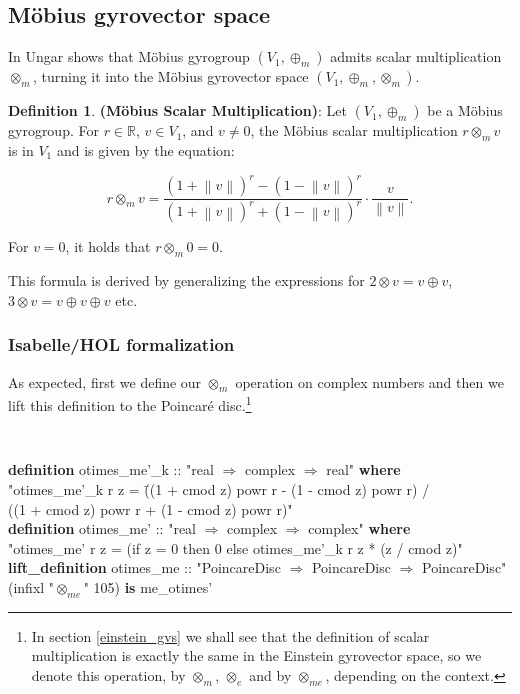 \documentclass[a4paper]{article}
\newcommand{\tab}{\hspace{5mm}}
\theoremstyle{definition}
\newtheorem{definition}{Definition}[section]
\newcommand{\norm}[1]{\left\lVert#1\right\rVert}
\begin{document}
\subsection{M\"obius gyrovector space}

In \cite{ungar-analytic} Ungar shows that M\" obius gyrogroup
$(V_1, \oplus_m)$ admits scalar multiplication $\otimes_m$, turning it
into the M\" obius gyrovector space $(V_1, \oplus_m, \otimes_m)$.

\begin{definition}\textbf{(M\" obius Scalar Multiplication)}: Let
  $(V_1, \oplus_m)$ be a M\" obius gyrogroup. For $r \in \mathbb{R}$,
  $v \in V_1$, and $v \neq 0$, the M\" obius scalar multiplication
  $r\otimes_{m} v$ is in $V_1$ and is given by the equation:

  \begin{equation}
   \label{eq:otimes}
    r\otimes_{m} v = \frac{(1+\norm{v})^r - (1-\norm{v})^r}{(1+\norm{v})^r + (1-\norm{v})^r}\cdot\frac{v}{\norm{v}}.
  \end{equation}
  

  \noindent For $v=0$, it holds that $r\otimes_{m} 0 = 0$.
\end{definition}

This formula is derived by generalizing the expressions for
$2\otimes v = v \oplus v$, $3\otimes v = v \oplus v \oplus v$ etc.

\subsubsection{Isabelle/HOL formalization}

As expected, first we define our $\otimes_m$ operation on complex
numbers and then we lift this definition to the Poincar\'e
disc.\footnote{In section \ref{einstein_gvs} we shall see that the
  definition of scalar multiplication is exactly the same in the
  Einstein gyrovector space, so we denote this operation, by
  $\otimes_m$, $\otimes_e$ and by $\otimes_{me}$, depending on the
  context.}

{\tt
\begin{small}
\begin{tabbing}
{\bf definition}  otimes\_me'\_k  :: "real $\Rightarrow$ complex $\Rightarrow$ real" {\bf where}\\
\tab "otimes\_me'\_k r z = \=((1 + cmod z) powr r - (1 - cmod z) powr r) /\\
\>                  ((1 + cmod z) powr r + (1 - cmod z) powr r)"\\ 
{\bf definition} otimes\_me' :: "real $\Rightarrow$ complex $\Rightarrow$ complex" {\bf where}\\
\tab "otimes\_me' r z = (if z = 0 then 0 else otimes\_me'\_k r z * (z / cmod z)"\\
{\bf lift\_definition} otimes\_me :: "PoincareDisc $\Rightarrow$ PoincareDisc $\Rightarrow$ PoincareDisc" \\
\tab (infixl "$\otimes_{me}$" 105) {\bf is} me\_otimes'
\end{tabbing}
\end{small}
}
\end{document}
